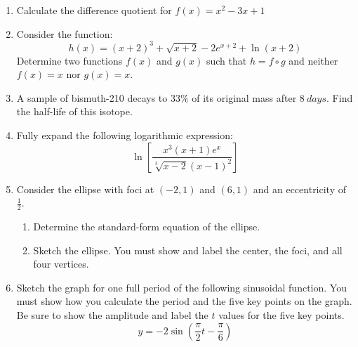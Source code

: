\documentclass[letterpaper,12pt,fleqn]{article}
\begin{document}
\begin{enumerate}[left=0pt]
\item Calculate the difference quotient for \(f(x)=x^2-3x+1\)

  \vspace{5in}

\item Consider the function:
  \[h(x)=(x+2)^3+\sqrt{x+2}-2e^{x+2}+\ln(x+2)\]
  Determine two functions \(f(x)\) and \(g(x)\) such that \(h=f\circ g\) and neither \(f(x)=x\) nor \(g(x)=x\).

  \newpage

\item A sample of bismuth-210 decays to \(33\%\) of its original mass after \(\SI{8}{days}\). Find the half-life of
  this isotope.

  \vspace{4in}

\item Fully expand the following logarithmic expression:
  \[\ln\left[\frac{x^3(x+1)e^x}{\sqrt[3]{x-2}(x-1)^2}\right]\]

  \newpage

\item Consider the ellipse with foci at \((-2,1)\) and \((6,1)\) and an eccentricity of \(\frac{1}{2}\).
  \begin{enumerate}
  \item Determine the standard-form equation of the ellipse.

    \vspace{4in}

  \item Sketch the ellipse.  You must show and label the center, the foci, and all four vertices.

    \bigskip
    
    \begin{center}
    \end{center}
  \end{enumerate}

  \newpage

\item Sketch the graph for one full period of the following sinusoidal function.  You must show how you calculate
  the period and the five key points on the graph.  Be sure to show the amplitude and label the $t$ values for the
  five key points.
  \[y=-2\sin\left(\frac{\pi}{2}t-\frac{\pi}{6}\right)\]


\end{enumerate}
\end{document}

